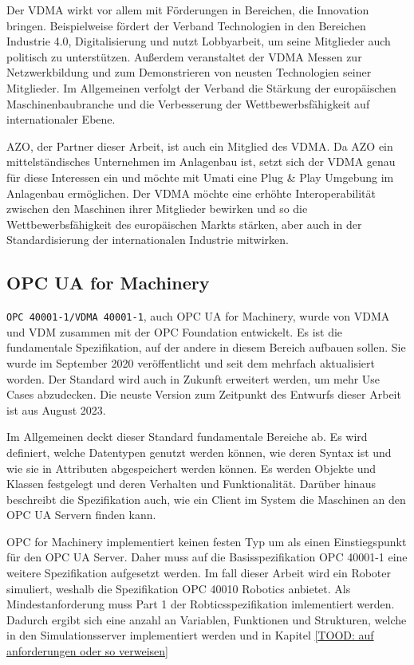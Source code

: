 \documentclass[a4paper, 12pt, oneside]{scrbook}
\begin{document}
		Der VDMA wirkt vor allem mit Förderungen in Bereichen, die Innovation bringen. Beispielweise fördert der Verband Technologien in den Bereichen Industrie 4.0, Digitalisierung und nutzt Lobbyarbeit, um seine Mitglieder auch politisch zu unterstützen. Außerdem veranstaltet der VDMA Messen zur Netzwerkbildung und zum Demonstrieren von neusten Technologien seiner Mitglieder. Im Allgemeinen verfolgt der Verband die Stärkung der europäischen Maschinenbaubranche und die Verbesserung der Wettbewerbsfähigkeit auf internationaler Ebene. \cite{noauthor_themenubersicht_nodate}
		
		AZO, der Partner dieser Arbeit, ist auch ein Mitglied des VDMA. Da AZO ein mittelständisches Unternehmen im Anlagenbau ist, setzt sich der VDMA genau für diese Interessen ein und möchte mit Umati eine Plug \& Play Umgebung im Anlagenbau ermöglichen. Der VDMA möchte eine erhöhte Interoperabilität zwischen den Maschinen ihrer Mitglieder bewirken und so die Wettbewerbsfähigkeit des europäischen Markts stärken, aber auch in der Standardisierung der internationalen Industrie mitwirken. 
		
		\subsection{OPC UA for Machinery}
		
		\texttt{OPC 40001-1/VDMA 40001-1}, auch OPC UA for Machinery, wurde von VDMA und VDM zusammen mit der OPC Foundation entwickelt. Es ist die fundamentale Spezifikation, auf der andere in diesem Bereich aufbauen sollen. Sie wurde im September 2020 veröffentlicht und seit dem mehrfach aktualisiert worden. Der Standard wird auch in Zukunft erweitert werden, um mehr Use Cases abzudecken. Die neuste Version zum Zeitpunkt des Entwurfs dieser Arbeit ist aus August 2023.
		
		Im Allgemeinen deckt dieser Standard fundamentale Bereiche ab. Es wird definiert, welche Datentypen genutzt werden können, wie deren Syntax ist und wie sie in Attributen abgespeichert werden können. Es werden Objekte und Klassen festgelegt und deren Verhalten und Funktionalität. Darüber hinaus beschreibt die Spezifikation auch, wie ein Client im System die Maschinen an den OPC UA Servern finden kann. 
		
		OPC for Machinery implementiert keinen festen Typ um als einen Einstiegspunkt für den OPC UA Server. Daher muss auf die Basisspezifikation OPC 40001-1 eine weitere Spezifikation aufgesetzt werden. Im fall dieser Arbeit wird ein Roboter simuliert, weshalb die Spezifikation OPC 40010 Robotics anbietet. Als Mindestanforderung muss Part 1 der Robticsspezifikation imlementiert werden. Dadurch ergibt sich eine anzahl an Variablen, Funktionen und Strukturen, welche in den Simulationsserver implementiert werden und in Kapitel \ref{TOOD: auf anforderungen oder so verweisen}
		
\end{document}
